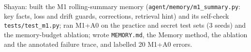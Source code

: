 \item Shayan: built the M1 rolling-summary memory (\texttt{agent/memory/m1\_summary.py}: key facts, loss and drift guards, corrections, retrieval hint) and its self-check \texttt{tests/test\_m1.py}; ran M1+A0 on the practice and secret test sets (3 seeds) and the memory-budget ablation; wrote \texttt{MEMORY.md}, the Memory method, the ablation and the annotated failure trace, and labelled 20 M1+A0 errors.
